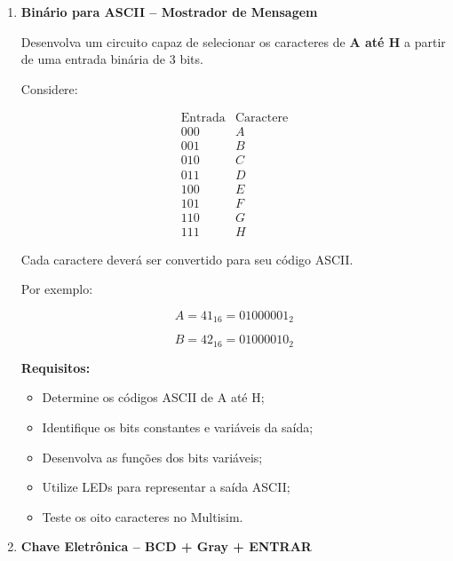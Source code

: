 \documentclass[a4paper,12pt]{article}
\begin{document}
\begin{enumerate}[leftmargin=*]
\vspace{0.4cm}


\item \textbf{Binário para ASCII -- Mostrador de Mensagem}

Desenvolva um circuito capaz de selecionar os caracteres de
\textbf{A até H} a partir de uma entrada binária de 3 bits.

Considere:

\[
\begin{array}{c|c}
\text{Entrada} & \text{Caractere} \\ \hline
000 & A \\
001 & B \\
010 & C \\
011 & D \\
100 & E \\
101 & F \\
110 & G \\
111 & H
\end{array}
\]

Cada caractere deverá ser convertido para seu código ASCII.

Por exemplo:

\[
A = 41_{16} = 01000001_2
\]

\[
B = 42_{16} = 01000010_2
\]

\textbf{Requisitos:}

\begin{itemize}
    \item Determine os códigos ASCII de A até H;
    \item Identifique os bits constantes e variáveis da saída;
    \item Desenvolva as funções dos bits variáveis;
    \item Utilize LEDs para representar a saída ASCII;
    \item Teste os oito caracteres no Multisim.
\end{itemize}

\vspace{0.4cm}


\item \textbf{Chave Eletrônica -- BCD + Gray + ENTRAR}


\end{enumerate}
\end{document}
